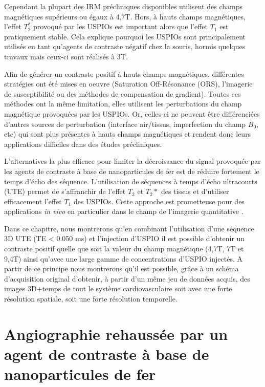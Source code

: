 Cependant la plupart des IRM précliniques disponibles utilisent des champs magnétiques supérieurs ou égaux à 4,7T. Hors, à hauts champs magnétiques, l'effet $T_2^*$ provoqué par les USPIOs est important alors que l'effet $T_1$ est pratiquement stable. Cela explique pourquoi les USPIOs sont principalement utilisés en tant qu'agents de contraste négatif chez la souris, hormis quelques travaux \cite{Jung:2014aa,Girard:2011ec,Loubeyre:1997aa} mais ceux-ci sont réalisés à 3T.

Afin de générer un contraste positif à hauts champs magnétiques, différentes stratégies ont été mises en oeuvre (Saturation Off-Résonance (ORS), l'imagerie de susceptibilité ou des méthodes de compensation de gradient). Toutes ces méthodes ont la même limitation, elles utilisent les perturbations du champ magnétique provoquées par les USPIOs. Or, celles-ci ne peuvent être différenciées d'autres sources de perturbation (interface air/tissus, imperfection du champ $B_0$, etc) qui sont plus présentes à hauts champs magnétiques et rendent donc leurs applications difficiles dans des études précliniques.

L'alternatives la plus efficace pour limiter la décroissance du signal provoquée par les agents de contraste à base de nanoparticules de fer est de réduire fortement le temps d'écho des séquence. L'utilisation de séquences à temps d'écho ultracourts (UTE) permet de s'affranchir de l'effet $T_2$ et $T_2*$ des tissus \cite{Tyler2007Magnetic-resona} et d'utiliser efficacement l'effet $T_1$ des USPIOs. Cette approche est prometteuse pour des applications \textit{in vivo} en particulier dans le champ de l'imagerie quantitative \cite{Girard:2011ec,Gharagouzloo2015Quantitative-co}.


Dans ce chapitre, nous montrerons qu'en combinant l'utilisation d'une séquence 3D UTE (TE < 0.050 ms) et l'injection d'USPIO il est possible d'obtenir un contraste positif quelle que soit la valeur du champ  magnétique (4,7T, 7T et 9,4T) ainsi qu'avec une large gamme de concentrations d'USPIO injectés. A partir de ce principe nous montrerons qu’il est possible, grâce à un schéma d’acquisition original d’obtenir, à partir d’un même jeu de données acquis, des images 3D+temps de tout le système cardiovasculaire soit avec une forte résolution spatiale, soit une forte résolution temporelle.


\section{Angiographie rehaussée par un agent de contraste à base de nanoparticules de fer}

